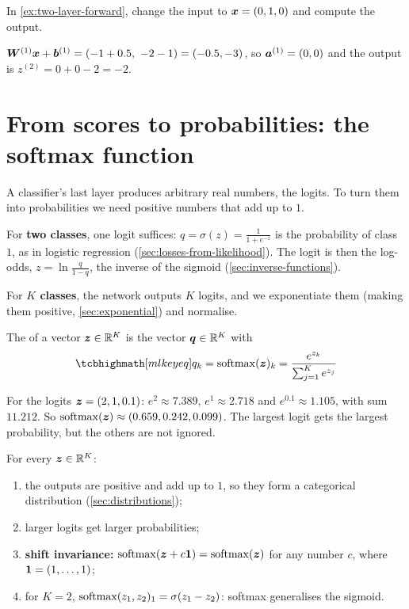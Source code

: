 \begin{exercise}
In \cref{ex:two-layer-forward}, change the input to $\bm{x} = (0, 1, 0)$ and compute
the output.
\end{exercise}
\begin{solution}
$\bm{W}^{(1)}\bm{x} + \bm{b}^{(1)} = (-1 + 0.5,\ -2 - 1) = (-0.5, -3)$, so $\bm{a}^{(1)} = (0,
0)$ and the output is $z^{(2)} = 0 + 0 - 2 = -2$.
\end{solution}

\section{From scores to probabilities: the softmax function}\label{sec:softmax}

A classifier's last layer produces arbitrary real numbers, the logits. To turn
them into probabilities we need positive numbers that add up to $1$.

For \textbf{two classes}, one logit suffices: $q = \sigma(z) = \frac{1}{1 + e^{-z}}$
is the probability of class $1$, as in logistic regression
(\cref{sec:losses-from-likelihood}). The logit is then the log-odds,
$z = \ln\frac{q}{1 - q}$, the inverse of the sigmoid (\cref{sec:inverse-functions}).

For \textbf{$K$ classes}, the network outputs $K$ logits, and we exponentiate
them (making them positive, \cref{sec:exponential}) and normalise.

\begin{definition}[Softmax]\label{def:softmax}
The  of a vector $\bm{z} \in \mathbb{R}^K$ is the vector $\bm{q} \in \mathbb{R}^K$ with
\[
  \keyeq{q_k = \softmax(\vz)_k = \frac{e^{z_k}}{\sum_{j=1}^K e^{z_j}}}
\]
\end{definition}

\begin{example}\label{ex:softmax}
For the logits $\bm{z} = (2, 1, 0.1)$: $e^2 \approx 7.389$, $e^1 \approx 2.718$ and
$e^{0.1} \approx 1.105$, with sum $11.212$. So
$\operatorname{softmax}(\bm{z}) \approx (0.659, 0.242, 0.099)$. The largest logit gets the largest
probability, but the others are not ignored.
\end{example}

\begin{theorem}\label{thm:softmax-properties}
For every $\bm{z} \in \mathbb{R}^K$:
\begin{enumerate}
  \item the outputs are positive and add up to $1$, so they form a categorical
    distribution (\cref{sec:distributions});
  \item larger logits get larger probabilities;
  \item \textbf{shift invariance:} $\operatorname{softmax}(\bm{z} + c\bm{1}) = \operatorname{softmax}(\bm{z})$ for any
    number $c$, where $\bm{1} = (1, \dots, 1)$;
  \item for $K = 2$, $\operatorname{softmax}(z_1, z_2)_1 = \sigma(z_1 - z_2)$: softmax
    generalises the sigmoid.
\end{enumerate}
\end{theorem}

